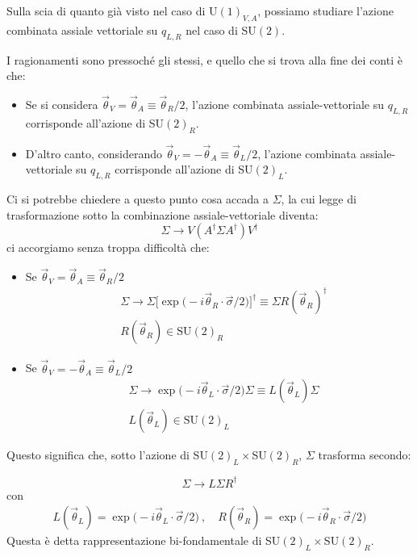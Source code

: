 \documentclass[../main.tex]{subfiles}
\begin{document}
\begin{nota}
    Sulla scia di quanto già visto nel caso di U$(1)_{V,A}$, possiamo studiare l'azione combinata assiale vettoriale su $q_{L,R}$ nel caso di SU$(2)$.

    I ragionamenti sono pressoché gli stessi, e quello che si trova alla fine dei conti è che:
    \begin{itemize}
    \item Se si considera $\Vec\theta_V=\Vec\theta_A \equiv \Vec\theta_R/2$, l'azione combinata assiale-vettoriale su $q_{L,R}$ corrisponde all'azione di SU$(2)_R$. 

    \item D'altro canto, considerando $\Vec\theta_V=-\Vec\theta_A \equiv \Vec\theta_L/2$, l'azione combinata assiale-vettoriale su $q_{L,R}$ corrisponde all'azione di SU$(2)_L$.
    \end{itemize}

    Ci si potrebbe chiedere a questo punto cosa accada a $\Sigma$, la cui legge di trasformazione sotto la combinazione assiale-vettoriale diventa:
    \[
    \Sigma \rightarrow V(A^\dagger\Sigma A^\dagger)V^\dagger
    \]
    ci accorgiamo senza troppa difficoltà che:
    \begin{itemize}
        \item Se $\Vec\theta_V=\Vec\theta_A\equiv \Vec\theta_R/2$
        \begin{align*}
            &\Sigma \rightarrow \Sigma\big[\exp\big(-i\Vec\theta_R\cdot\Vec{\sigma}/2)\big]^\dagger \equiv \Sigma R(\Vec\theta_R)^\dagger \\
            &R(\Vec\theta_R) \in \text{SU}(2)_R
        \end{align*}
        \item Se $\Vec\theta_V=-\Vec\theta_A\equiv \Vec\theta_L/2$
        \begin{align*}
            &\Sigma \rightarrow \exp\big(-i\Vec\theta_L\cdot\Vec{\sigma}/2\big) \Sigma\equiv L(\Vec\theta_L)\Sigma \\
            &L(\Vec\theta_L) \in \text{SU}(2)_L
        \end{align*}
    \end{itemize}
    Questo significa che, sotto l'azione di SU$(2)_L\times$SU$(2)_R$, $\Sigma$ trasforma secondo:
    
    \[\boxed{\Sigma \rightarrow L\Sigma R^\dagger}\]
    con
    \begin{align*}
        L(\Vec\theta_L) = \exp\big(-i\Vec\theta_L\cdot\Vec{\sigma}/2\big) ~, \quad R(\Vec\theta_R) = \exp\big(-i\Vec\theta_R\cdot\Vec{\sigma}/2\big)
    \end{align*}
    Questa è detta rappresentazione bi-fondamentale di  SU$(2)_L\times$SU$(2)_R$.
    \label{note:bifundamental_repres}
\end{nota}
\end{document}
